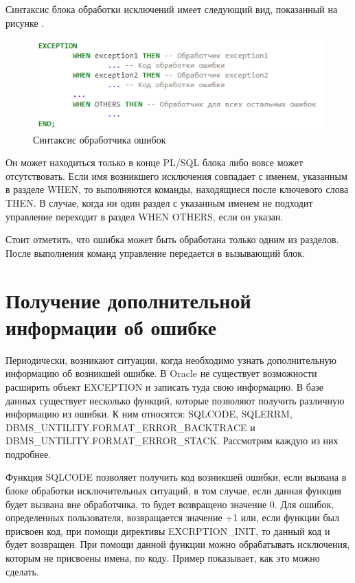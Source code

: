 Синтаксис блока обработки исключений имеет следующий вид, показанный на рисунке .

\begin{figure}[ht!] 
	\center
	\includegraphics [scale=1] {my_folder/img/C1_exeception_handling_syntax}
	\caption{Синтаксис обработчика ошибок} 
	\label{fig:C1_exeception_handling_syntax}  
\end{figure}
\FloatBarrier

Он может находиться только в конце PL/SQL блока либо вовсе может отсутствовать. Если имя возникшего исключения совпадает с именем, указанным в разделе WHEN, то выполняются команды, находящиеся после ключевого слова THEN. В случае, когда ни один раздел с указанным именем не подходит управление переходит в раздел WHEN OTHERS, если он указан. 

Стоит отметить, что ошибка может быть обработана только одним из разделов. После выполнения команд управление передается в вызывающий блок. 


\section{Получение дополнительной информации об ошибке}\label{ch1:sec5}
Периодически, возникают ситуации, когда необходимо узнать дополнительную информацию об возникшей ошибке. В Oracle не существует возможности расширить объект EXCEPTION и записать туда свою информацию. В базе данных существует несколько функций, которые позволяют получить различную информацию из ошибки. К ним относятся: SQLCODE, SQLERRM, DBMS\_UNTILITY.FORMAT\_ERROR\_BACKTRACE и DBMS\_UNTILITY.FORMAT\_ERROR\_STACK. 
Рассмотрим каждую из них подробнее. 

Функция SQLCODE позволяет получить код возникшей ошибки, если вызвана в блоке обработки исключительных ситуаций, в том случае, если данная функция будет вызвана вне обработчика, то будет возвращено значение 0. Для ошибок, определенных пользователя, возвращается значение +1 или, если функции был присвоен код, при помощи директивы EXCRPTION\_INIT, то данный код и будет возвращен. 
При помощи данной функции можно обрабатывать исключения, которым не присвоены имена, по коду. Пример  показывает, как это можно сделать. 

